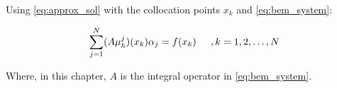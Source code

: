 Using \ref{eq:approx_sol} with the collocation points $x_{k}$ and \ref{eq:bem_system}:

\begin{equation}\label{eq:collocation}
    \sum_{j=1}^{N} (A \mu_{h}^{j})(x_{k}) \alpha_{j} = f(x_{k}) \hspace{0.2in}, k=1,2, \dots, N
\end{equation}



Where, in this chapter, $A$ is the integral operator in \autoref{eq:bem_system}.




